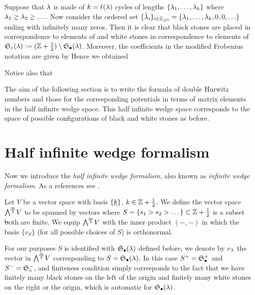 \documentclass[../main/main.tex]{subfiles}
\begin{document}
Suppose that $\lambda$ is made of $k=\ell(\lambda)$ cycles of lengths $\{\lambda_1,\ldots,\lambda_k\}$ where $\lambda_1\geq\lambda_2\geq\ldots$. Now consider the ordered set $\{\tilde {\lambda}_i\}_{i\in\mathbb Z_{\geq0}}=\{\lambda_1,\ldots,\lambda_k,0,0,\ldots\}$ ending with infinitely many zeros. Then it is clear that black stones are placed in correspondence to elements of 
and white stones in correspondence to elements of $\mathfrak S_\circ(\lambda):=(\mathbb Z+\frac12)\setminus\mathfrak S_\bullet(\lambda)$. Moreover, the coefficients in the modified Frobenius notation are given by
Hence we obtained

Notice also that

The aim of the following section is to write the formula of double Hurwitz numbers and those for the corresponding potentials in terms of matrix elements in the half infinite wedge space. This half infinite wedge space corresponds to the space of possible configurations of black and white stones as before.

\section{Half infinite wedge formalism}

Now we introduce the \emph{half infinite wedge formalism}, also known as \emph{infinite wedge formalism}. As a references see \cite{MJD,O2,J}.

Let $V$ be a vector space with basis $\{\underline{k}\}$, $k\in\mathbb Z+\frac12$. We define the vector space $\bigwedge^{\!\frac\infty2}\!V$ to be spanned by vectors
where $S=\{s_1>s_2>\dots\}\subset\mathbb Z+\frac12$ is a subset \st both
are finite. We equip $\bigwedge^{\!\frac\infty2}\!V$ with the inner product $(-,-)$ in which the basis $\{v_S\}$ (for all possible choices of $S$) is orthonormal. 

For our purposes $S$ is identified with $\mathfrak S_\bullet(\lambda)$ defined before, we denote by $v_\lambda$ the vector in $\bigwedge^{\!\frac\infty2}\!V$ corresponding to $S=\mathfrak S_\bullet(\lambda)$. In this case $S^+=\mathfrak S_\bullet^+$ and $S^-=\mathfrak S_\circ^-$, and finiteness condition simply corresponds to the fact that we have finitely many black stones on the left of the origin and finitely many white stones on the right or the origin, which is automatic for $\mathfrak S_\bullet(\lambda)$. 
\end{document}

